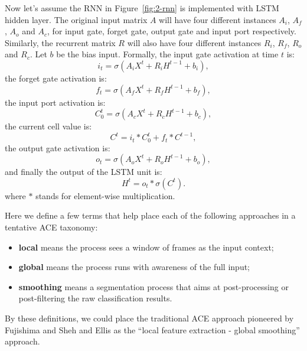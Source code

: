 Now let's assume the RNN in Figure~\ref{fig:2-rnn} is implemented with LSTM hidden layer. The original input matrix $A$ will have four different instances $A_i$, $A_f$, $A_o$ and $A_c$, for input gate, forget gate, output gate and input port respectively. Similarly, the recurrent matrix $R$ will also have four different instances $R_i$, $R_f$, $R_o$ and $R_c$. Let $b$ be the bias input. Formally, the input gate activation at time $t$ is:
\begin{equation}
i_t = \sigma(A_iX^t + R_iH^{t-1}+b_i),
\end{equation}
the forget gate activation is:
\begin{equation}
f_t = \sigma(A_fX^t + R_fH^{t-1}+b_f),
\end{equation}
the input port activation is:
\begin{equation}
C^t_0 = \sigma(A_cX^t + R_cH^{t-1}+b_c),
\end{equation}
the current cell value is:
\begin{equation}
C^t = i_t*C^t_0 + f_t*C^{t-1},
\end{equation}
the output gate activation is:
\begin{equation}
o_t = \sigma(A_oX^t + R_oH^{t-1}+b_o),
\end{equation}
and finally the output of the LSTM unit is:
\begin{equation}
H^t = o_t*\sigma(C^t).
\end{equation}
where $*$ stands for element-wise multiplication.

Here we define a few terms that help place each of the following approaches in a tentative ACE taxonomy:
\begin{itemize}
\item \textbf{local} means the process sees a window of frames as the input context;
\item \textbf{global} means the process runs with awareness of the full input;
\item \textbf{smoothing} means a segmentation process that aims at post-processing or post-filtering the raw classification results.
\end{itemize}
By these definitions, we could place the traditional ACE approach pioneered by Fujishima \cite{fujishima1999realtime} and Sheh and Ellis \cite{sheh2003chord} as the ``local feature extraction - global smoothing'' approach.

